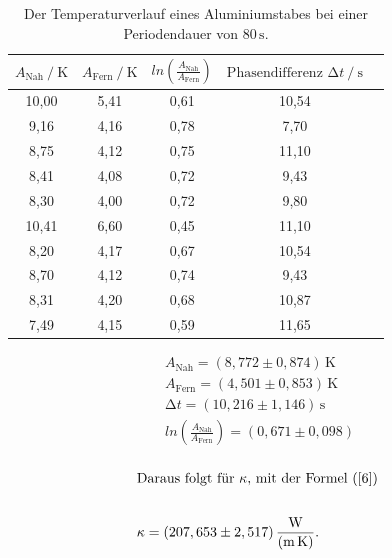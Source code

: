 \begin{table}[H]
    \centering
    \caption{Der Temperaturverlauf eines Aluminiumstabes bei einer Periodendauer von $80\,\unit{\second}$.}
    \label{Tabelle3}
    \begin{tabular} {c     c     c     c     c}
        \toprule
        {$ A_{\text{Nah}}  \mathbin{/} \unit{\kelvin} $} &
        {$ A_{\text{Fern}} \mathbin{/} \unit{\kelvin}$} &
        {$ ln\left(\frac{A_{\text{Nah}}}{A_{\text{Fern}}}\right)$} &
        {$ \text{Phasendifferenz}\,\, \increment t  \mathbin{/} \unit{\second} $} \\
        \midrule
        10,00 & 5,41 & 0,61 & 10,54 \\
         9,16 & 4,16 & 0,78 &  7,70 \\
         8,75 & 4,12 & 0,75 & 11,10 \\
         8,41 & 4,08 & 0,72 &  9,43 \\
         8,30 & 4,00 & 0,72 &  9,80 \\
        10,41 & 6,60 & 0,45 & 11,10 \\
         8,20 & 4,17 & 0,67 & 10,54 \\
         8,70 & 4,12 & 0,74 &  9,43 \\
         8,31 & 4,20 & 0,68 & 10,87 \\
         7,49 & 4,15 & 0,59 & 11,65 \\
        \bottomrule
    \end{tabular} 
\end{table}

\begin{align*}
    A_{\text{Nah}} = (8,772 \pm 0,874)\,\unit{\kelvin}\\
    A_{\text{Fern}} = (4,501 \pm 0,853)\,\unit{\kelvin}\\
    \increment t = (10,216 \pm 1,146)\,\unit{\second}\\
    ln\left(\frac{A_{\text{Nah}}}{A_{\text{Fern}}}\right) = (0,671 \pm 0,098)\\
\end{align*}

\begin{align*}
    \intertext{Daraus folgt für $\kappa$, mit der Formel (\ref{6}) }\\
    \kappa = (207,653 \pm 2,517)\,\frac{\unit{\watt}}{(\unit{\meter\kelvin})}.\\
\end{align*}

